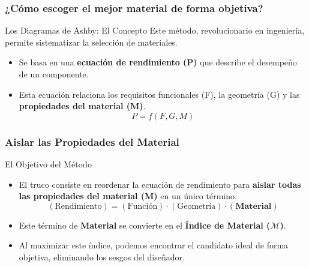 \begin{frame}
  \frametitle{¿Cómo escoger el mejor material de forma objetiva?}
  \begin{block}{Los Diagramas de Ashby: El Concepto}
    Este método, revolucionario en ingeniería, permite sistematizar la selección
    de materiales.

    \begin{itemize}
      \item Se basa en una \textbf{ecuación de rendimiento (P)} que describe el
        desempeño de un componente.
      \item Esta ecuación relaciona los requisitos funcionales (F), la geometría
        (G) y las \textbf{propiedades del material (M)}.
        $$ P = f(F, G, M) $$
    \end{itemize}
  \end{block}
\end{frame}

\begin{frame}
  \frametitle{Aislar las Propiedades del Material}
  \begin{block}{El Objetivo del Método}
    \begin{itemize}
      \item El truco consiste en reordenar la ecuación de rendimiento para
        \textbf{aislar todas las propiedades del material (M)} en un único
        término.
        $$ (\text{Rendimiento}) = (\text{Función}) \cdot (\text{Geometría})
        \cdot (\textbf{Material}) $$
      \item Este término de \textbf{Material} se convierte en el \textbf{Índice
        de Material ($\mathcal{M}$)}.
      \item Al maximizar este índice, podemos encontrar el candidato ideal de
        forma objetiva, eliminando los sesgos del diseñador.
    \end{itemize}
  \end{block}
\end{frame}

